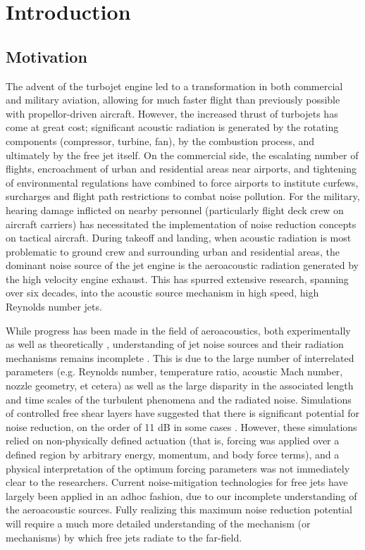 \chapter{Introduction}
\label{introduction}
\section{Motivation}
The advent of the turbojet engine led to a transformation in both commercial and military aviation, allowing for much faster flight than previously possible with propellor-driven aircraft. 
However, the increased thrust of turbojets has come at great cost; significant acoustic radiation is generated by the rotating components (compressor, turbine, fan), by the combustion process, and ultimately by the free jet itself. 
On the commercial side, the escalating number of flights, encroachment of urban and residential areas near airports, and tightening of environmental regulations have combined to force airports to institute curfews, surcharges and flight path restrictions to combat noise pollution. 
For the military, hearing damage inflicted on nearby personnel (particularly flight deck crew on aircraft carriers) has necessitated the implementation of noise reduction concepts on tactical aircraft.
During takeoff and landing, when acoustic radiation is most problematic to ground crew and  surrounding urban and residential areas, the dominant noise source of the jet engine is the aeroacoustic radiation generated by the high velocity engine exhaust.
This has spurred extensive research, spanning over six decades, into the acoustic source mechanism in high speed, high Reynolds number jets. 

While progress has been made in the field of aeroacoustics, both experimentally \citep{Tam1996, Viswanathan2006, Tam2008} as well as theoretically \citep{Cabana2008}, understanding of jet noise sources and their radiation mechanisms remains incomplete \citep{Jordan2008}.
This is due to the large number of interrelated parameters (e.g. Reynolds number, temperature ratio, acoustic Mach number, nozzle geometry, et cetera) as well as the large disparity in the associated length and time scales of the turbulent phenomena and the radiated noise.
Simulations of controlled free shear layers have suggested that there is significant potential for noise reduction, on the order of 11 dB in some cases \citep{Wei2006}.
However, these simulations relied on non-physically defined actuation (that is, forcing was applied over a defined region by arbitrary energy, momentum, and body force terms), and a physical interpretation of the optimum forcing parameters was not immediately clear to the researchers.
Current noise-mitigation technologies for free jets have largely been applied in an adhoc fashion, due to our incomplete understanding of the aeroacoustic sources.
Fully realizing this maximum noise reduction potential will require a much more detailed understanding of the mechanism (or mechanisms) by which free jets radiate to the far-field.

